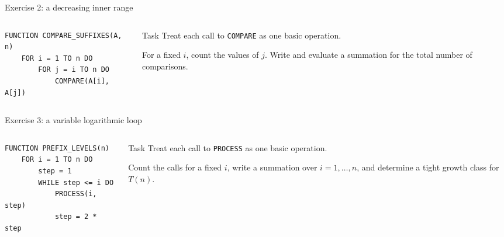 \documentclass[aspectratio=169]{beamer}
\begin{document}
\begin{frame}[fragile]{Exercise 2: a decreasing inner range}
  \begin{columns}[T]
    \begin{column}{0.55\textwidth}
\begin{lstlisting}[style=pseudo,basicstyle=\ttfamily\small]
FUNCTION COMPARE_SUFFIXES(A, n)
    FOR i = 1 TO n DO
        FOR j = i TO n DO
            COMPARE(A[i], A[j])
\end{lstlisting}
    \end{column}
    \begin{column}{0.41\textwidth}
      \begin{block}{Task}
        Treat each call to \texttt{COMPARE} as one basic operation.

        For a fixed $i$, count the values of $j$. Write and evaluate a
        summation for the total number of comparisons.
      \end{block}
    \end{column}
  \end{columns}
\end{frame}

\begin{frame}[fragile]{Exercise 3: a variable logarithmic loop}
  \begin{columns}[T]
    \begin{column}{0.55\textwidth}
\begin{lstlisting}[style=pseudo,basicstyle=\ttfamily\small]
FUNCTION PREFIX_LEVELS(n)
    FOR i = 1 TO n DO
        step = 1
        WHILE step <= i DO
            PROCESS(i, step)
            step = 2 * step
\end{lstlisting}
    \end{column}
    \begin{column}{0.41\textwidth}
      \begin{block}{Task}
        Treat each call to \texttt{PROCESS} as one basic operation.

        Count the calls for a fixed $i$, write a summation over
        $i=1,\ldots,n$, and determine a tight growth class for $T(n)$.
      \end{block}
    \end{column}
  \end{columns}
\end{frame}
\end{document}
